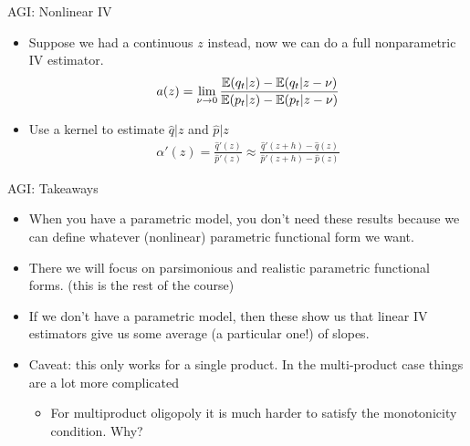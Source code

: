 \begin{frame}{AGI: Nonlinear IV}
\begin{itemize}
\item Suppose we had a continuous $z$ instead, now we can do a full nonparametric IV estimator.
\begin{eqnarray*}
a(z) = \lim_{\nu \rightarrow 0} \frac{\mathbb{E}(q_t | z) - \mathbb{E}(q_t | z-\nu)}{\mathbb{E}(p_t | z) - \mathbb{E}(p_t | z- \nu)}
\end{eqnarray*}
\item Use a kernel to estimate $\hat{q}|z$ and $\hat{p}|z$
\begin{eqnarray*}
\alpha'(z) =\frac{\hat{q}'(z)}{\hat{p}'(z)} \approx \frac{\hat{q}'(z+h) - \hat{q}(z)}{\hat{p}'(z+h) - \hat{p}(z)}
\end{eqnarray*}
\end{itemize}
\end{frame}



\begin{frame}{AGI: Takeaways}
\begin{itemize}
\item When you have a parametric model, you don't need these results because we can define whatever (nonlinear) parametric functional form we want.
\item There we will focus on parsimonious and realistic parametric functional forms. (this is the rest of the course)
\item If we don't have a parametric model, then these show us that linear IV estimators give us some average (a particular one!) of slopes.
\item Caveat: this only works for a single product. In the multi-product case things are a lot more complicated
\begin{itemize}
\item For multiproduct oligopoly it is much harder to satisfy the \alert{monotonicity} condition.  Why?
\end{itemize}
\end{itemize}
\end{frame}
















































